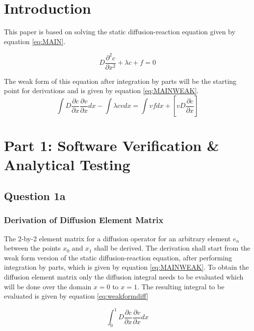 \documentclass[11pt]{article}
\begin{document}


\clearpage
{}
\section{Introduction}

This paper is based on solving the static diffusion-reaction equation given by equation \ref{eq:MAIN}.


\begin{equation}\label{eq:MAIN}
D \frac{\partial^2 c}{\partial x^2} + \lambda c + f = 0
\end{equation}

The weak form of this equation after integration by parts will be the starting point for derivations and is given by equation \ref{eq:MAINWEAK}.
\begin{equation} \label{eq:MAINWEAK}
\int D \frac{\partial c}{\partial x}  \frac{\partial v}{\partial x}  dx - \int \lambda cvdx  = \int vf dx + \left[vD\frac{\partial c}{\partial x} \right]
\end{equation}


\section{Part 1: Software Verification \& Analytical Testing}

\subsection{Question 1a}
\subsubsection{Derivation of Diffusion Element Matrix}

The 2-by-2 element matrix for a diffusion operator for an arbitrary element $e_{n}$ between the points $x_{0}$ and $x_{1}$ shall be derived.  The derivation shall start from the weak form version of the static diffusion-reaction equation, after performing integration by parts, which is given by equation \ref{eq:MAINWEAK}.  To obtain the diffusion element matrix only the diffusion integral needs to be evaluated which will be done over the domain $x = 0$ to $x = 1$. The resulting integral to be evaluated is given by equation \ref{eq:weakformdiff}

\begin{equation} \label{eq:weakformdiff}
\int_0^1 D \frac{\partial c}{\partial x}  \frac{\partial v}{\partial x}  dx 
\end{equation}
\end{document}
